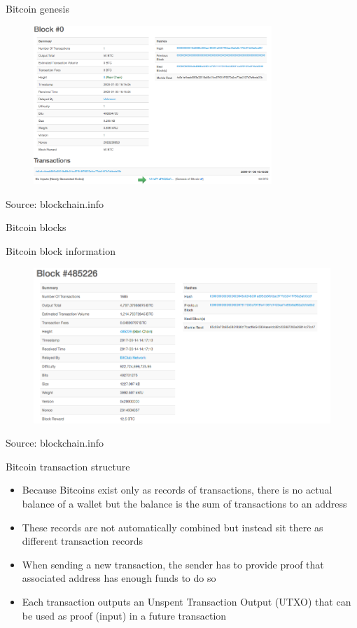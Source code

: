 \documentclass[11pt]{beamer}
\begin{document}
\begin{frame}{Bitcoin genesis}
	\begin{figure}[]
		\centering
		\includegraphics  [width=90mm]{Images/genesis}
	\end{figure}
	\begin{tiny}
		Source: blockchain.info
	\end{tiny}
\end{frame}


\begin{frame}{Bitcoin blocks}
	\begin{scriptsize}
		Bitcoin block information
	\end{scriptsize}
	\begin{figure}[]
		\centering
		\includegraphics  [width=4.in]{Images/block}
	\end{figure}
	\begin{tiny}
		Source: blockchain.info
	\end{tiny}
\end{frame}



\begin{frame}{Bitcoin transaction structure}
	\begin{itemize}
		\item Because Bitcoins exist only as records of transactions, there is no actual balance of a wallet but the balance is the sum of transactions to an address
		\item These records are not automatically combined but instead sit there as different transaction records
		\item When sending a new transaction, the sender has to provide proof that associated address has enough funds to do so
		\item Each transaction outputs an Unspent Transaction Output (UTXO) that can be used as proof (input) in a future transaction
	\end{itemize}
\end{frame}
\end{document}
